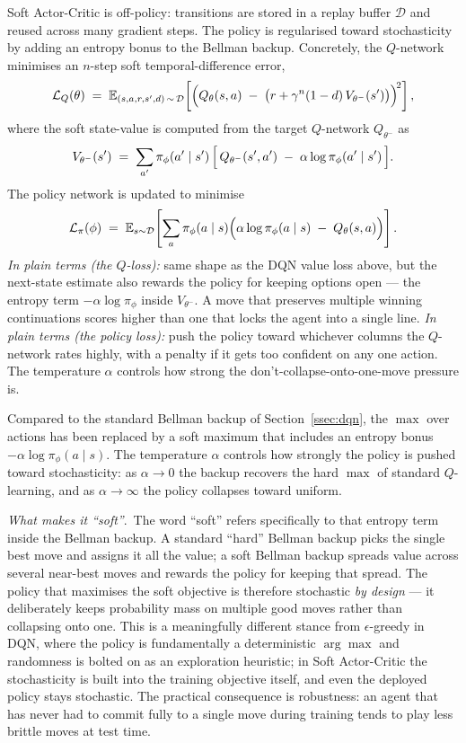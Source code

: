 \documentclass[11pt]{article}
\begin{document}
Soft Actor-Critic is off-policy: transitions are stored in a replay
buffer $\mathcal{D}$ and reused across many gradient steps. The policy
is regularised toward stochasticity by adding an entropy bonus to the
Bellman backup. Concretely, the $Q$-network minimises an $n$-step soft
temporal-difference error,
\[
    \mathcal{L}_Q(\theta)
    \;=\;
    \mathbb{E}_{(s, a, r, s', d) \,\sim\, \mathcal{D}}
    \!\left[
    \Bigl(
    Q_\theta(s, a)
    \;-\;
    \bigl(r + \gamma^{n}(1 - d)\, V_{\theta^{-}}(s')\bigr)
    \Bigr)^{\!2}
    \right],
\]
where the soft state-value is computed from the target $Q$-network
$Q_{\theta^{-}}$ as
\[
    V_{\theta^{-}}(s')
    \;=\;
    \sum_{a'} \pi_\phi(a' \mid s')\,
    \Bigl[\,
    Q_{\theta^{-}}(s', a')
    \;-\;
    \alpha \log \pi_\phi(a' \mid s')
    \,\Bigr].
\]
The policy network is updated to minimise
\[
    \mathcal{L}_\pi(\phi)
    \;=\;
    \mathbb{E}_{s \sim \mathcal{D}}
    \!\left[
    \sum_{a} \pi_\phi(a \mid s)
    \Bigl(
    \alpha \log \pi_\phi(a \mid s)
    \;-\;
    Q_\theta(s, a)
    \Bigr)
    \right].
\]
\textit{In plain terms (the $Q$-loss):} same shape as the DQN value
loss above, but the next-state estimate also rewards the policy for
keeping options open --- the entropy term $-\alpha\log\pi_\phi$ inside
$V_{\theta^{-}}$. A move that preserves multiple winning continuations
scores higher than one that locks the agent into a single line.
\textit{In plain terms (the policy loss):} push the policy toward
whichever columns the $Q$-network rates highly, with a penalty if it
gets too confident on any one action. The temperature $\alpha$
controls how strong the don't-collapse-onto-one-move pressure is.

Compared to the standard Bellman backup of Section~\ref{ssec:dqn}, the
$\max$ over actions has been replaced by a soft maximum that includes
an entropy bonus $-\alpha \log \pi_\phi(a \mid s)$. The temperature
$\alpha$ controls how strongly the policy is pushed toward
stochasticity: as $\alpha \to 0$ the backup recovers the hard $\max$ of
standard $Q$-learning, and as $\alpha \to \infty$ the policy collapses
toward uniform.

\textit{What makes it ``soft''}.\, The word ``soft'' refers
specifically to that entropy term inside the Bellman backup. A
standard ``hard'' Bellman backup picks the single best move and
assigns it all the value; a soft Bellman backup spreads value across
several near-best moves and rewards the policy for keeping that
spread. The policy that maximises the soft objective is therefore
stochastic \emph{by design} --- it deliberately keeps probability
mass on multiple good moves rather than collapsing onto one. This is
a meaningfully different stance from $\epsilon$-greedy in DQN, where
the policy is fundamentally a deterministic $\arg\max$ and randomness
is bolted on as an exploration heuristic; in Soft Actor-Critic the
stochasticity is built into the training objective itself, and even
the deployed policy stays stochastic. The practical consequence is
robustness: an agent that has never had to commit fully to a single
move during training tends to play less brittle moves at test time.
\end{document}
